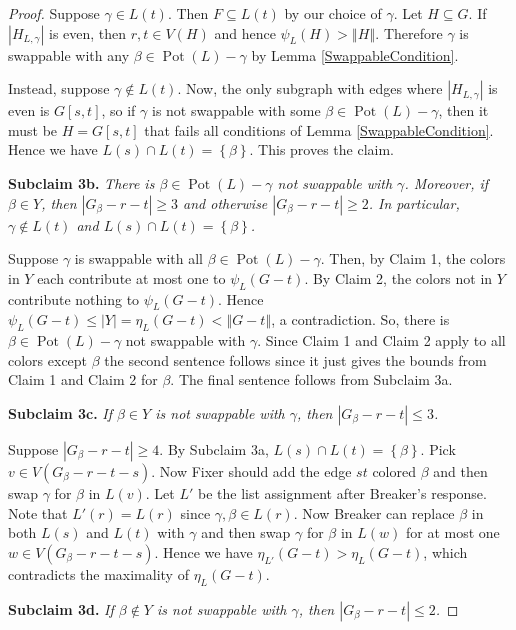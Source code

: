 \documentclass[12pt,reqno]{amsart}
\theoremstyle{plain}
\theoremstyle{definition}
\theoremstyle{remark}
\newcommand{\set}[1]{\left\{ #1 \right\}}
\newcommand{\card}[1]{\left|#1\right|}
\newcommand{\size}[1]{\left\Vert#1\right\Vert}
\newcommand{\pot}{\operatorname{Pot}}
\begin{document}
\begin{proof}
Suppose $\gamma \in L(t)$. Then $F \subseteq L(t)$ by our choice of $\gamma$. Let $H \subseteq G$.  If $\card{H_{L, \gamma}}$ is even, then $r, t \in V(H)$ and hence $\psi_L(H) > \size{H}$.  Therefore $\gamma$ is swappable with any $\beta \in \pot(L) - \gamma$ by Lemma \ref{SwappableCondition}.

Instead, suppose $\gamma \not \in L(t)$.  Now, the only subgraph with edges where $\card{H_{L, \gamma}}$ is even is $G[s, t]$, so if $\gamma$ is not swappable with some $\beta \in \pot(L) - \gamma$, then it must be $H = G[s, t]$ that fails all conditions of Lemma \ref{SwappableCondition}.  Hence we have $L(s) \cap L(t) = \set{\beta}$.  This proves the claim.

\noindent\textbf{Subclaim 3b.  }\textit{There is $\beta \in \pot(L) - \gamma$ not swappable with $\gamma$.  Moreover, if $\beta \in Y$, then $\card{G_\beta - r - t} \ge 3$ and otherwise $\card{G_\beta - r - t} \ge 2$.  In particular, $\gamma \not \in L(t)$ and $L(s) \cap L(t) = \set{\beta}$.}

Suppose $\gamma$ is swappable with all $\beta \in \pot(L) - \gamma$.  Then, by Claim 1, the colors in $Y$ each contribute at most one to $\psi_L(G - t)$.  By Claim 2, the colors not in $Y$ contribute nothing to $\psi_L(G - t)$.  Hence $\psi_L(G - t) \le \card{Y} = \eta_L(G - t) < \size{G-t}$, a contradiction.  So, there is $\beta \in \pot(L) - \gamma$ not swappable with $\gamma$. Since Claim 1 and Claim 2 apply to all colors except $\beta$ the second sentence follows since it just gives the bounds from Claim 1 and Claim 2 for $\beta$.  The final sentence follows from Subclaim 3a.

\noindent\textbf{Subclaim 3c.  }\textit{If $\beta \in Y$ is not swappable with $\gamma$, then $\card{G_\beta - r - t} \le 3$.}

Suppose $\card{G_\beta - r - t} \ge 4$. By Subclaim 3a, $L(s) \cap L(t) = \set{\beta}$.  Pick $v \in V(G_\beta - r - t - s)$.  Now Fixer should add the edge $st$ colored $\beta$ and then swap $\gamma$ for $\beta$ in $L(v)$.  Let $L'$ be the list assignment after Breaker's response. Note that $L'(r) = L(r)$ since $\gamma, \beta \in L(r)$.  Now Breaker can replace $\beta$ in both $L(s)$ and $L(t)$ with $\gamma$ and then swap $\gamma$ for $\beta$ in $L(w)$ for at most one $w \in V(G_\beta - r - t - s)$. Hence we have $\eta_{L'}(G - t) > \eta_L(G - t)$, which contradicts the maximality of $\eta_L(G - t)$.

\noindent\textbf{Subclaim 3d.  }\textit{If $\beta \not \in Y$ is not swappable with $\gamma$, then $\card{G_\beta - r - t} \le 2$.}


\end{proof}
\end{document}
